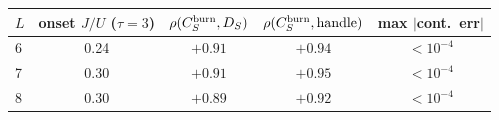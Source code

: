 \begin{tabular}{lcccc}
\toprule
$L$ & onset $J/U$ ($\tau{=}3$) & $\rho(C_S^{\rm burn},D_S)$ & $\rho(C_S^{\rm burn},\text{handle})$ & max $|$cont.\ err$|$ \\
\midrule
6 & 0.24 & $+0.91$ & $+0.94$ & $<10^{-4}$ \\
7 & 0.30 & $+0.91$ & $+0.95$ & $<10^{-4}$ \\
8 & 0.30 & $+0.89$ & $+0.92$ & $<10^{-4}$ \\
\bottomrule
\end{tabular}
